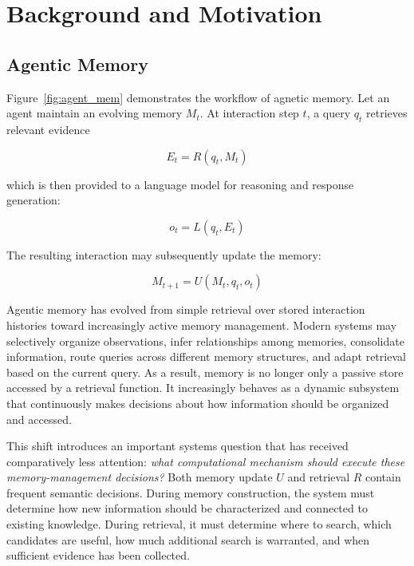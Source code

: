 \documentclass[11pt]{article}
\begin{document}
\section{Background and Motivation}
\label{sec:background}
\subsection{Agentic Memory}
Figure~\ref{fig:agent_mem} demonstrates the workflow of agnetic memory. Let an agent maintain an evolving memory $M_t$. At interaction step $t$, a query $q_t$ retrieves relevant evidence

\begin{equation}
E_t = R(q_t, M_t)
\end{equation}

which is then provided to a language model for reasoning and response generation:

\begin{equation}
o_t = L(q_t, E_t)
\end{equation}

The resulting interaction may subsequently update the memory:

\begin{equation}
M_{t+1} = U(M_t, q_t, o_t)
\end{equation}

Agentic memory has evolved from simple retrieval over stored interaction histories toward increasingly active memory management. Modern systems may selectively organize observations, infer relationships among memories, consolidate information, route queries across different memory structures, and adapt retrieval based on the current query. As a result, memory is no longer only a passive store accessed by a retrieval function. It increasingly behaves as a dynamic subsystem that continuously makes decisions about how information should be organized and accessed.

This shift introduces an important systems question that has received comparatively less attention: \emph{what computational mechanism should execute these memory-management decisions?} Both memory update $U$ and retrieval $R$ contain frequent semantic decisions. During memory construction, the system must determine how new information should be characterized and connected to existing knowledge. During retrieval, it must determine where to search, which candidates are useful, how much additional search is warranted, and when sufficient evidence has been collected.
\end{document}
